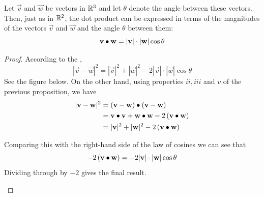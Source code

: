 \documentclass[handout]{ximera}
\begin{document}
\begin{proposition}
Let $\vec{v}$ and $\vec{w}$
be vectors in $\mathbb R^3$ and let $\theta$ denote the angle between these vectors.  
Then, just as in $\mathbb R^2$, the dot product can be expressed in terms of the 
magnitudes of the vectors $\vec{v}$ and $\vec{w}$ and the angle $\theta$ between them:
\[
\mathbf{v}\bullet\mathbf{w} = |\mathbf{v}|\cdot |\mathbf{w}| \cos\theta
\]
\begin{proof}
According to the , 
\[
|\vec{v} - \vec{w}|^2 = |\vec{v}|^2 + |\vec{w}|^2 - 2|\vec{v}|\cdot| \vec{w}|\cos \theta
\]
See the figure below. On the other hand, using properties $ii, iii$ and $v$ of the previous proposition, we have
\begin{align*}
|\mathbf{v} - \mathbf{w}|^2 &= \left(\mathbf{v} - \mathbf{w}\right)\bullet \left(\mathbf{v} - \mathbf{w}\right)\\
                          &= \mathbf{v} \bullet \mathbf{v} + \mathbf{w} \bullet \mathbf{w} - 2\left(\mathbf{v} \bullet \mathbf{w}\right)\\
                          &=|\mathbf{v}|^2 + |\mathbf{w}|^2 - 2\left(\mathbf{v} \bullet \mathbf{w}\right)
\end{align*}

Comparing this with the right-hand side of the law of cosines we can see that
\[
- 2\left(\mathbf{v} \bullet \mathbf{w}\right) = - 2|\mathbf{v}|\cdot| \mathbf{w}|\cos \theta
\]
Dividing through by $-2$ gives the final result.

\begin{image}
\end{image}

\end{proof}

\end{proposition}
\end{document}
